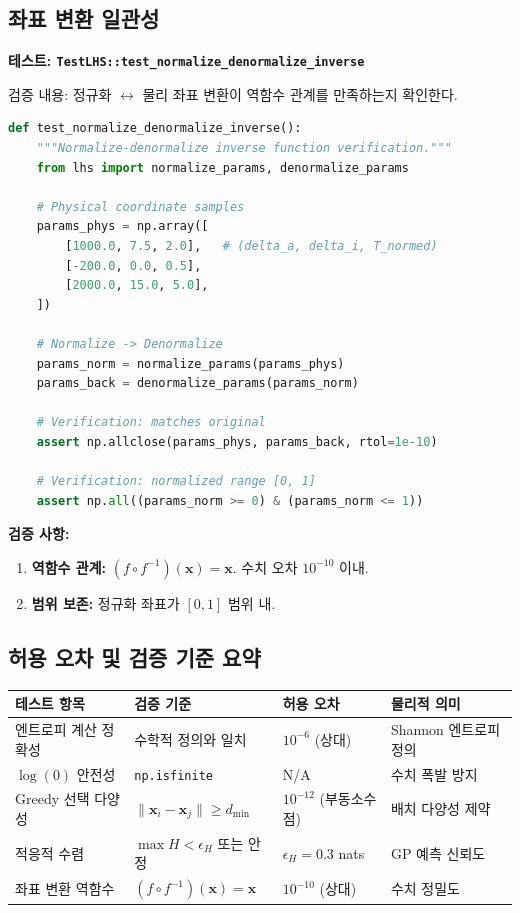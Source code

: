 \documentclass[11pt]{article}
\begin{document}
\subsection{좌표 변환 일관성}

\textbf{테스트: \texttt{TestLHS::test\_normalize\_denormalize\_inverse}}

검증 내용: 정규화 $\leftrightarrow$ 물리 좌표 변환이 역함수 관계를 만족하는지 확인한다.

\begin{lstlisting}[language=Python]
def test_normalize_denormalize_inverse():
    """Normalize-denormalize inverse function verification."""
    from lhs import normalize_params, denormalize_params

    # Physical coordinate samples
    params_phys = np.array([
        [1000.0, 7.5, 2.0],   # (delta_a, delta_i, T_normed)
        [-200.0, 0.0, 0.5],
        [2000.0, 15.0, 5.0],
    ])

    # Normalize -> Denormalize
    params_norm = normalize_params(params_phys)
    params_back = denormalize_params(params_norm)

    # Verification: matches original
    assert np.allclose(params_phys, params_back, rtol=1e-10)

    # Verification: normalized range [0, 1]
    assert np.all((params_norm >= 0) & (params_norm <= 1))
\end{lstlisting}

\textbf{검증 사항:}
\begin{enumerate}[label=\arabic*.]
  \item \textbf{역함수 관계:} $(f \circ f^{-1})(\mathbf{x}) = \mathbf{x}$. 수치 오차 $10^{-10}$ 이내.
  \item \textbf{범위 보존:} 정규화 좌표가 $[0,1]$ 범위 내.
\end{enumerate}


\subsection{허용 오차 및 검증 기준 요약}

\begin{table}[htbp]
\centering
\small
\begin{tabular}{@{}llll@{}}
\toprule
테스트 항목 & 검증 기준 & 허용 오차 & 물리적 의미 \\
\midrule
엔트로피 계산 정확성 & 수학적 정의와 일치 & $10^{-6}$ (상대) & Shannon 엔트로피 정의 \\
$\log(0)$ 안전성 & \texttt{np.isfinite} & N/A & 수치 폭발 방지 \\
Greedy 선택 다양성 & $\|\mathbf{x}_i - \mathbf{x}_j\| \geq d_{\min}$ & $10^{-12}$ (부동소수점) & 배치 다양성 제약 \\
적응적 수렴 & $\max H < \epsilon_H$ 또는 안정 & $\epsilon_H = 0.3$ nats & GP 예측 신뢰도 \\
좌표 변환 역함수 & $(f \circ f^{-1})(\mathbf{x}) = \mathbf{x}$ & $10^{-10}$ (상대) & 수치 정밀도 \\
\bottomrule
\end{tabular}
\end{table}
\end{document}
